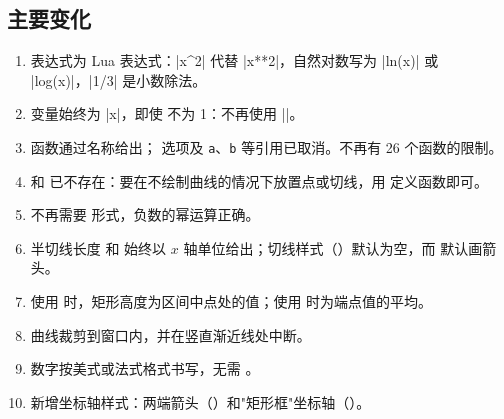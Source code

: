 \subsection{主要变化}

\begin{enumerate}
  \item 表达式为 Lua 表达式：|x^2| 代替 |x**2|，自然对数写为 |ln(x)| 或 |log(x)|，|1/3| 是小数除法。
  \item 变量始终为 |x|，即使  不为 1：不再使用 |\x|。
  \item 函数通过名称给出； 选项及 \texttt{a}、\texttt{b} 等引用已取消。不再有 26 个函数的限制。
  \item {} 和  已不存在：要在不绘制曲线的情况下放置点或切线，用  定义函数即可。
  \item 不再需要  形式，负数的幂运算正确。
  \item 半切线长度  和  始终以 $x$ 轴单位给出；切线样式（）默认为空，而  默认画箭头。
  \item 使用  时，矩形高度为区间中点处的值；使用  时为端点值的平均。
  \item 曲线裁剪到窗口内，并在竖直渐近线处中断。
  \item 数字按美式或法式格式书写，无需 。
  \item 新增坐标轴样式：两端箭头（）和"矩形框"坐标轴（）。
\end{enumerate}

\endinput
